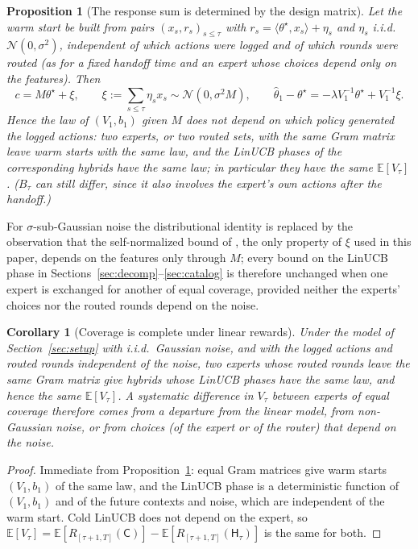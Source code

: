 \documentclass{article}
\newtheorem{proposition}{Proposition}
\newtheorem{corollary}{Corollary}
\theoremstyle{definition}
\theoremstyle{remark}
\newcommand{\E}{\mathbb{E}}
\theoremstyle{remark}
\newcommand{\Cold}{\mathsf{C}}
\newcommand{\Hyb}{\mathsf{H}}
\begin{document}
\begin{proposition}[The response sum is determined by the design matrix]
\label{prop:response-sum}
Let the warm start be built from pairs $(x_s,r_s)_{s\le\tau}$ with
$r_s=\langle\theta^\star,x_s\rangle+\eta_s$ and $\eta_s$ i.i.d.\
$\mathcal N(0,\sigma^2)$, independent of which actions were logged and of
which rounds were routed (as for a fixed handoff time and an expert whose
choices depend only on the features). Then
\[
c=M\theta^\star+\xi,\qquad \xi:=\sum_{s\le\tau}\eta_sx_s\sim\mathcal N(0,\sigma^2M),
\qquad
\widehat\theta_1-\theta^\star=-\lambda V_1^{-1}\theta^\star+V_1^{-1}\xi .
\]
Hence the law of $(V_1,b_1)$ given $M$ does not depend on which policy
generated the logged actions: two experts, or two routed sets, with the same
Gram matrix leave warm starts with the same law, and the LinUCB phases of the
corresponding hybrids have the same law; in particular they have the same
$\E[V_\tau]$. ($B_\tau$ can still differ, since it also involves the expert's
own actions after the handoff.)
\end{proposition}

For $\sigma$-sub-Gaussian noise the distributional identity is replaced by the
observation that the self-normalized bound of \cite{abbasi2011improved}, the
only property of $\xi$ used in this paper, depends on the features only
through $M$; every bound on the LinUCB phase in
Sections~\ref{sec:decomp}--\ref{sec:catalog} is therefore unchanged when one
expert is exchanged for another of equal coverage, provided neither the
experts' choices nor the routed rounds depend on the noise.

\begin{corollary}[Coverage is complete under linear rewards]
\label{cor:coverage-complete}
Under the model of Section~\ref{sec:setup} with i.i.d.\ Gaussian noise, and
with the logged actions and routed rounds independent of the noise, two
experts whose routed rounds leave the same Gram matrix give hybrids whose
LinUCB phases have the same law, and hence the same $\E[V_\tau]$. A systematic
difference in $V_\tau$ between experts of equal coverage therefore comes from
a departure from the linear model, from non-Gaussian noise, or from choices
(of the expert or of the router) that depend on the noise.
\end{corollary}

\begin{proof}
Immediate from Proposition~\ref{prop:response-sum}: equal Gram matrices give
warm starts $(V_1,b_1)$ of the same law, and the LinUCB phase is a
deterministic function of $(V_1,b_1)$ and of the future contexts and noise,
which are independent of the warm start. Cold LinUCB does not depend on the
expert, so $\E[V_\tau]=\E[R_{[\tau+1,T]}(\Cold)]-\E[R_{[\tau+1,T]}(\Hyb_\tau)]$
is the same for both.
\end{proof}
\end{document}
